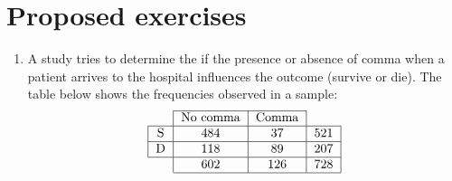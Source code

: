 \section{Proposed exercises}
\begin{enumerate}[leftmargin=*]

\item A study tries to determine the if the presence or absence of comma when a patient arrives to the hospital influences the outcome (survive or die). The table below shows the frequencies observed in a sample:
\[
\begin{tabular}{l|l|l|l|}
\cline{2-3}
\multicolumn{1}{c|}{} & \multicolumn{1}{c|}{No comma} & \multicolumn{1}{c|}{Comma} & \multicolumn{1}{c}{} \\
\hline
\multicolumn{1}{|c|}{S} & \multicolumn{1}{c|}{484} & \multicolumn{1}{c|}{37} & \multicolumn{1}{c|}{521} \\
\hline
\multicolumn{1}{|c|}{D} & \multicolumn{1}{c|}{118} & \multicolumn{1}{c|}{89} & \multicolumn{1}{c|}{207} \\
\hline
\multicolumn{1}{c|}{} & \multicolumn{1}{c|}{602} & \multicolumn{1}{c|}{126} & \multicolumn{1}{c|}{728} \\
\cline{2-4}
\end{tabular}
\]


\end{enumerate}

